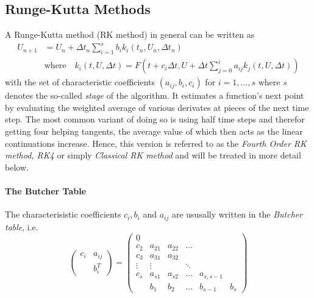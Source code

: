 \subsection{Runge-Kutta Methods}

A Runge-Kutta method (RK method) in general can be written as
\begin{align}
U_{n+1} &= U_n + \Delta t_n \sum_{i=1}^s b_i k_i(t_n, U_n, \Delta t_n) \\
&\text{where} \quad k_i(t, U, \Delta t) = F(t+c_i\Delta t, U+ \Delta t\sum_{j=0}^{i} a_{ij} k_j(t,U,\Delta t))
\end{align}
with the set of characteristic coefficients $(a_{ij}, b_i, c_i)$ for $i = 1,...,s$ where $s$ denotes the so-called \emph{stage} of the algorithm.
It estimates a function's next point by evaluating the weighted average of various derivates at pieces of the next time step.
The most common variant of doing so is using half time steps and therefor getting four helping tangents, the average value of which then acts as the linear continuations increase. Hence, this version is referred to as the \emph{Fourth Order RK method, RK4} or simply \emph{Classical RK method} and will be treated in more detail below.

\paragraph{The Butcher Table}
The characterisistic coefficients $c_i, b_i$ and $a_{ij}$ are ususally written in the \emph{Butcher table}, i.e.
\begin{equation}
  \begin{pmatrix}
    c_i & a_{ij} \\
    & b_i^T
  \end{pmatrix}
  =
  \begin{pmatrix}
    0 &&&&\\
    c_2 & a_{21} & a_{22} & \dots & \\
    c_3 & a_{31} & a_{32} && \\
    \vdots & \vdots & &\ddots &\\
    c_s & a_{s1} & a_{s2} & \dots & a_{s, s-1} \\
    & b_1 & b_2 & \dots & b_{s-1} & b_s
  \end{pmatrix}
\end{equation}






